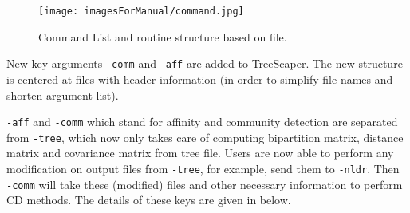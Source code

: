 \documentclass[11pt]{article}
\begin{document}
\begin{figure}[thbp!]\centering
	\texttt{[image: imagesForManual/command.jpg]}
	\caption{Command List and routine structure based on file.}
	\label{fig:command}
\end{figure}

New key arguments \texttt{-comm} and \texttt{-aff} are added to TreeScaper. The new structure is centered at files with header information (in order to simplify file names and shorten argument list).
	
\texttt{-aff} and \texttt{-comm} which stand for affinity and community detection are separated from \texttt{-tree}, which now only takes care of computing bipartition matrix, distance matrix and covariance matrix from tree file. Users are now able to perform any modification on output files from \texttt{-tree}, for example, send them to \texttt{-nldr}. Then \texttt{-comm} will take these (modified) files and other necessary information to perform CD methods. The details of these keys are given in below.
\end{document}
